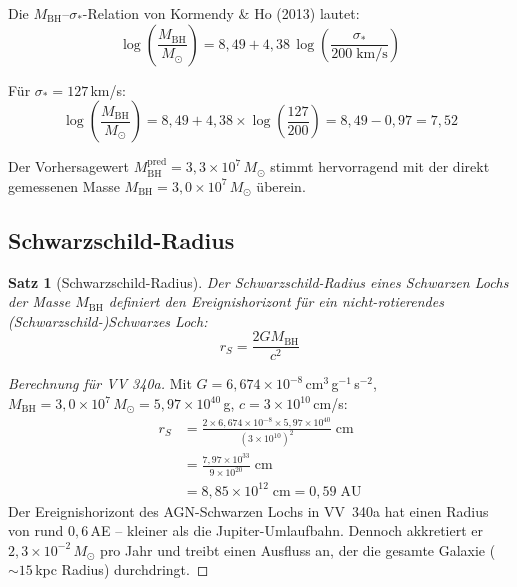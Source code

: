 ﻿\documentclass[12pt,a4paper]{report}
\newtheorem{theorem}{Satz}[chapter]
\begin{document}
Die $M_\mathrm{BH}$--$\sigma_*$-Relation von Kormendy \& Ho (2013) lautet:
\begin{equation}
	\log\left(\frac{M_\mathrm{BH}}{M_\odot}\right) = 8{,}49 + 4{,}38\,\log\left(\frac{\sigma_*}{200\;\text{km/s}}\right)
\end{equation}

Für $\sigma_* = 127$\,km/s:
\begin{equation}
	\log\left(\frac{M_\mathrm{BH}}{M_\odot}\right) = 8{,}49 + 4{,}38 \times \log\left(\frac{127}{200}\right) = 8{,}49 - 0{,}97 = 7{,}52
\end{equation}

Der Vorhersagewert $M_\mathrm{BH}^\mathrm{pred} = 3{,}3 \times 10^7\,M_\odot$ stimmt hervorragend mit der direkt gemessenen Masse $M_\mathrm{BH} = 3{,}0 \times 10^7\,M_\odot$ überein.

\subsection{Schwarzschild-Radius}

\begin{theorem}[Schwarzschild-Radius]
	Der Schwarzschild-Radius eines Schwarzen Lochs der Masse $M_\mathrm{BH}$ definiert den Ereignishorizont für ein nicht-rotierendes (Schwarzschild-)Schwarzes Loch:
	\begin{equation}
		r_S = \frac{2 G M_\mathrm{BH}}{c^2}
	\end{equation}
\end{theorem}

\begin{proof}[Berechnung für VV 340a]
	Mit $G = 6{,}674 \times 10^{-8}$\,cm$^3$\,g$^{-1}$\,s$^{-2}$, $M_\mathrm{BH} = 3{,}0 \times 10^7\,M_\odot = 5{,}97 \times 10^{40}$\,g, $c = 3 \times 10^{10}$\,cm/s:
	\begin{align}
		r_S &= \frac{2 \times 6{,}674 \times 10^{-8} \times 5{,}97 \times 10^{40}}{(3 \times 10^{10})^2}\;\text{cm} \\
		&= \frac{7{,}97 \times 10^{33}}{9 \times 10^{20}}\;\text{cm} \\
		&= 8{,}85 \times 10^{12}\;\text{cm} = 0{,}59\;\text{AU}
	\end{align}
	Der Ereignishorizont des AGN-Schwarzen Lochs in VV~340a hat einen Radius von rund $0{,}6$\,AE -- kleiner als die Jupiter-Umlaufbahn. Dennoch akkretiert er $2{,}3 \times 10^{-2}\,M_\odot$ pro Jahr und treibt einen Ausfluss an, der die gesamte Galaxie ($\sim 15$\,kpc Radius) durchdringt.
\end{proof}
\end{document}
